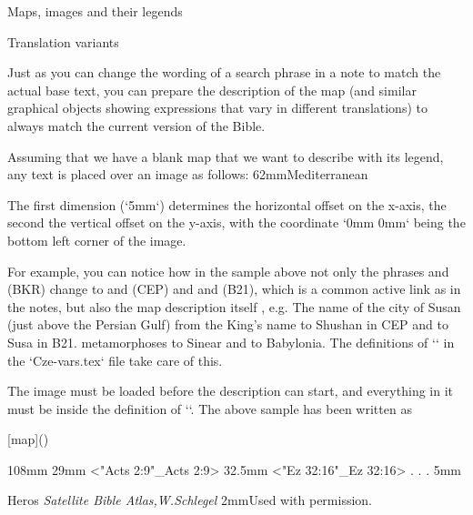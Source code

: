 {{{{{\sec[maps] Maps, images and their legends

 Translation variants

Just as you can change the wording of a search phrase in a note to match the actual base text, you can prepare 
the description of the map (and similar graphical objects showing expressions that vary in different translations) to always match the current version of the Bible.

Assuming that we have a blank map that we want to describe with its legend, any text is placed over an image as follows:
\begtt
\puttext 5mm 62mm{{{\bi Mediterranean}}}
\endtt

The first dimension (`5mm`) determines the horizontal offset on the x-axis, the second the vertical offset on the y-axis, with the coordinate `0mm 0mm` being the bottom left corner of the image.





\medskip
{} 
\medskip
{}
\medskip
For example, you can notice how in the sample above not only the phrases  and  (BKR) change to  and  (CEP) and 
and  (B21), which is a common active link as in the notes, but also the map description itself , e.g. 
The name of the city of Susan (just above the Persian Gulf) from the King's name to Shushan in CEP and to Susa in B21.
metamorphoses to Sinear and to Babylonia. The definitions of `\vdef` in the `Cze-vars.tex` file take care of this. 

The image must be loaded before the description can start, and everything in it must be inside the definition of `\insertBot`. 
The above sample has been written as

\begtt
{}[map](){
  \Heros \cond {}\rm %
  \vskip-1mm 
\putstext 2mm 108mm {%
  }%
  \LMfonts\sans {}\rm
  \puttext 145mm 29mm {<"Acts 2:9"_Acts 2:9>}
  \puttext 145mm 32.5mm {<"Ez 32:16"_Ez 32:16>}
.
.
.
  \puttext 2mm 5mm{{{{Heros \it Satellite Bible Atlas,\rm W.Schlegel}}
  \puttext 2mm 2mm{\Heros {}\rm Used with permission.}
  }%
\endtt

}}}}}}}

